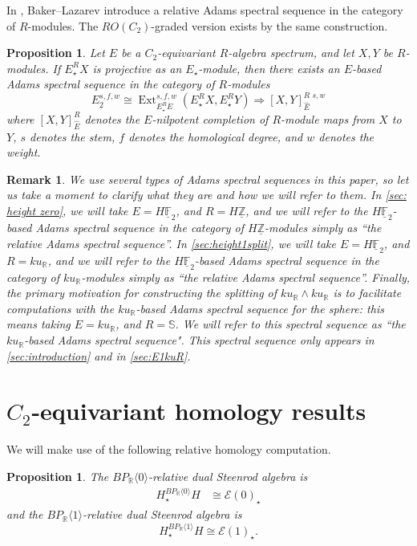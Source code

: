 \documentclass{amsart}
\newtheorem{proposition}[equation]{Proposition}
\newtheorem{remark}[equation]{Remark}
\theoremstyle{plain}
\numberwithin{equation}{section}
\numberwithin{figure}{section}
\DeclareMathOperator{\Ext}{Ext}
\newcommand{\mF}{{\mathbb F}}
\newcommand{\mR}{{\mathbb R}}
\newcommand{\mZ}{{\mathbb Z}}
\newcommand{\cE}{{\mathcal E}}
\newcommand{\umF}{\underline{\mF}}
\newcommand{\umZ}{\underline{\mZ}}
\newcommand{\0}{\langle 0 \rangle }
\newcommand{\one}{\langle 1 \rangle }
\begin{document}
In \cite[Prop~2.1]{baker2001adams}, Baker--Lazarev introduce a relative Adams spectral sequence in the category of $R$-modules. The $RO(C_2)$-graded version exists by the same construction.

\begin{proposition}\label{prop:relative ASS exists}
    Let $E$ be a $C_{2}$-equivariant $R$-algebra spectrum, and let $X,Y$ be $R$-modules. If $E_{\star}^{R}X$ is projective as an $E_{\star}$-module, then there exists an $E$-based Adams spectral sequence in the category of $R$-modules
\[
E_{2}^{s,f,w} \cong \Ext_{E_{\star}^{R} E}^{s,f,w} (E_\star^R X, E_\star^R Y) \Longrightarrow [X,Y]_{\widehat{E}}^{R \, \, s, w}
\]
 where $[X,Y]^{R}_{\widehat{E}}$ denotes the $E$-nilpotent completion of $R$-module maps from $X$ to $Y$, $s$ denotes the stem, $f$ denotes the homological degree, and $w$ denotes the weight.
\end{proposition}

\begin{remark} 
    \rm{We use several types of Adams spectral sequences in this paper, so let us take a moment to clarify what they are and how we will refer to them. In \cref{sec: height zero}, we will take $E = H\umF_{2}$, and $R = H\umZ$, and we will refer to the $H\umF_{2}$-based Adams spectral sequence in the category of $H\umZ$-modules simply as ``the relative Adams spectral sequence''. In \cref{sec:height1split}, we will take $E = H\umF_{2}$, and $R = ku_{\mR}$, and we will refer to the $H\umF_{2}$-based Adams spectral sequence in the category of $ku_{\mR}$-modules simply as ``the relative Adams spectral sequence''. Finally, the primary motivation for constructing the splitting of $ku_{\mR} \wedge ku_\mR$ is to facilitate computations with the $ku_{\mR}$-based Adams spectral sequence for the sphere: this means taking $E = ku_{\mR}$, and $R = \mathbb{S}$. We will refer to this spectral sequence as ``the $ku_{\mR}$-based Adams spectral sequence". This spectral sequence only appears in \cref{sec:introduction} and in \cref{sec:E1kuR}. }
\end{remark}


\section{{$C_2$}-equivariant homology results} \label{sec:C2homology}

We will make use of the following relative homology computation. 

\begin{proposition}\label{prop:relHomology} The $BP_\mR\0$-relative dual Steenrod algebra is
\begin{align*}
    H_{\star}^{BP_\mR\0}H & \cong \cE(0)_{\star} 
\end{align*}
and the $BP_\mR\one$-relative dual Steenrod algebra is 
    \[
    H_{\star}^{BP_\mR\one}H \cong \cE(1)_{\star}.
    \]
\end{proposition}
\end{document}
